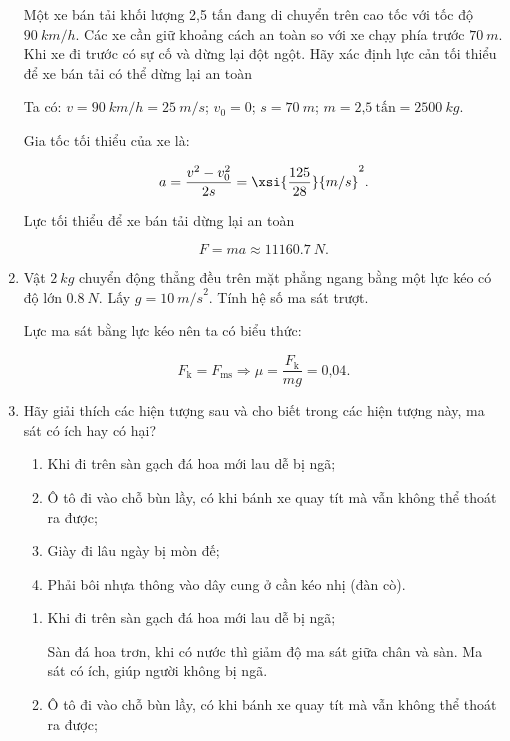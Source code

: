 \begin{enumerate}[label=\bfseries Câu \arabic*:]
	
	{ 
		Một xe bán tải khối lượng 2,5 tấn đang di chuyển trên cao tốc với tốc độ $\SI{90}{km/h}$. Các xe cần giữ khoảng cách an toàn so với xe chạy phía trước $\SI{70}{m}$. Khi xe đi trước có sự cố và dừng lại đột ngột. Hãy xác định lực cản tối thiểu để xe bán tải có thể dừng lại an toàn
		
	}
	
	\hideall
	{
		Ta có: $v = \SI{90}{km/h} = \SI{25}{m/s}$; $v_0 = 0$; $s = \SI{70}{m}$; $m = \text{2,5}\ \text{tấn} = \SI{2500}{kg}.$
		
		Gia tốc tối thiểu của xe là:
		
		$$a = \dfrac{v^2 - v_0^2}{2s} = \xsi{\dfrac{125}{28}}{m/s}^2.$$
		
		Lực tối thiểu để xe bán tải dừng lại an toàn
		
		$$F = ma \approx \SI{11160,7}{N}.$$
		
	
	}
	\item {}
	
	
	{Vật $\SI{2}{kg}$ chuyển động thẳng đều trên mặt phẳng ngang bằng một lực kéo có độ lớn $\SI{0,8}{N}$. Lấy $g=\SI{10}{m/s}^2$. Tính hệ số ma sát trượt.
	}
	
	\hideall
	{
		Lực ma sát bằng lực kéo nên ta có biểu thức:
		
		$$F_\text{k} = F_\text{ms} \Rightarrow \mu = \dfrac{F_\text{k}}{mg} =\text{0,04}.$$
	}
	\item {}
	
	
	{Hãy giải thích các hiện tượng sau và cho biết trong các hiện tượng này, ma sát có ích hay có hại?
		\begin{enumerate}
			\item Khi đi trên sàn gạch đá hoa mới lau dễ bị ngã;
			\item Ô tô đi vào chỗ bùn lầy, có khi bánh xe quay tít mà vẫn không thể thoát ra được;
			\item Giày đi lâu ngày bị mòn đế;
			\item Phải bôi nhựa thông vào dây cung ở cần kéo nhị (đàn cò).
		\end{enumerate}
	}
	
	\hideall
	{
		\begin{enumerate}
			\item Khi đi trên sàn gạch đá hoa mới lau dễ bị ngã;
			
			Sàn đá hoa trơn, khi có nước thì giảm độ ma sát giữa chân và sàn. Ma sát có ích, giúp người không bị ngã.
			
			\item Ô tô đi vào chỗ bùn lầy, có khi bánh xe quay tít mà vẫn không thể thoát ra được;
			

\end{enumerate}}
\end{enumerate}
